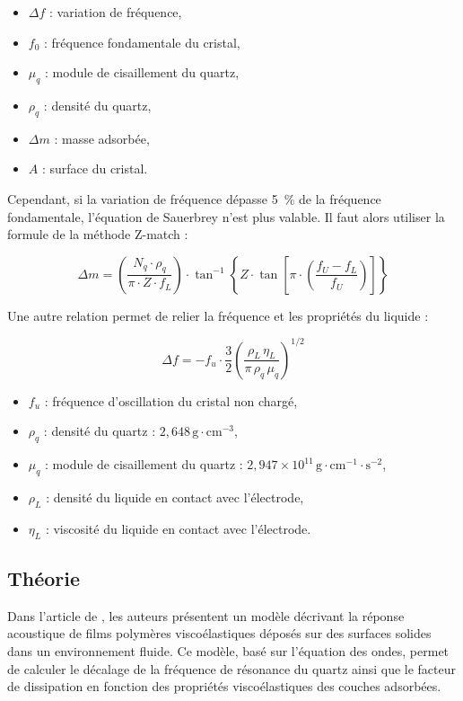 \begin{itemize}[label=\textbullet]
    \item $\Delta f$ : variation de fréquence,
    \item $f_0$ : fréquence fondamentale du cristal,
    \item $\mu_q$ : module de cisaillement du quartz,
    \item $\rho_q$ : densité du quartz,
    \item $\Delta m$ : masse adsorbée,
    \item $A$ : surface du cristal.
\end{itemize}

Cependant, si la variation de fréquence dépasse 5~\% de la fréquence fondamentale, l’équation de Sauerbrey n’est plus valable.  
Il faut alors utiliser la formule de la méthode Z-match \cite{qcm100manual} :

\begin{equation}
    \Delta m = \left( \frac{N_q \cdot \rho_q}{\pi \cdot Z \cdot f_L} \right) 
    \cdot \tan^{-1} \left\{ Z \cdot \tan \left[ \pi \cdot \left( \frac{f_U - f_L}{f_U} \right) \right] \right\}
\end{equation}

Une autre relation permet de relier la fréquence et les propriétés du liquide :

\[
\Delta f = -f_u \cdot \frac{3}{2} \left( \frac{\rho_L \, \eta_L}{\pi \, \rho_q \, \mu_q} \right)^{1/2}
\]

\begin{itemize}[label=\textbullet]
    \item $f_u$ : fréquence d'oscillation du cristal non chargé,
    \item $\rho_q$ : densité du quartz : $2{,}648\, \text{g}\cdot\text{cm}^{-3}$,
    \item $\mu_q$ : module de cisaillement du quartz : $2{,}947 \times 10^{11}\, \text{g}\cdot\text{cm}^{-1}\cdot\text{s}^{-2}$,
    \item $\rho_L$ : densité du liquide en contact avec l’électrode,
    \item $\eta_L$ : viscosité du liquide en contact avec l’électrode.
\end{itemize}

\subsection{Théorie}

Dans l’article de \cite{M_V_Voinova_1999}, les auteurs présentent un modèle décrivant la réponse acoustique de films polymères viscoélastiques déposés sur des surfaces solides dans un environnement fluide.  
Ce modèle, basé sur l’équation des ondes, permet de calculer le décalage de la fréquence de résonance du quartz ainsi que le facteur de dissipation en fonction des propriétés viscoélastiques des couches adsorbées.

